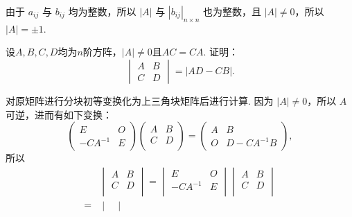 \begin{exercise}
\begin{exgroup}
\begin{answer}
            由于 $a_{ij}$ 与 $b_{ij}$ 均为整数，所以 $|A|$ 与 $|b_{ij}|_{n \times n}$ 也为整数，且 $|A| \neq 0$，所以 $|A| = \pm 1$.
        \end{answer}

        \item 设$A,B,C,D$均为$n$阶方阵，$\lvert A \rvert \neq 0$且$AC=CA$. 证明：
        \[\begin{vmatrix}
                A & B \\ C & D
            \end{vmatrix} = |AD-CB|.\]
        \begin{answer}
            对原矩阵进行分块初等变换化为上三角块矩阵后进行计算. 因为 $\lvert A \rvert \neq 0$，所以 $A$ 可逆，进而有如下变换：
            \[\begin{pmatrix}
                    E        & O \\
                    -CA^{-1} & E
                \end{pmatrix} \begin{pmatrix}
                    A & B \\
                    C & D \\
                \end{pmatrix} = \begin{pmatrix}
                    A & B          \\
                    O & D-CA^{-1}B
                \end{pmatrix},\]
            所以
            \begin{align*}
                    & \begin{vmatrix}
                            A & B \\
                            C & D \\
                        \end{vmatrix}
                = \begin{vmatrix}
                        E        & O \\
                        -CA^{-1} & E \\
                    \end{vmatrix}
                \begin{vmatrix}
                    A & B \\
                    C & D \\
                \end{vmatrix}       \\
                ={} & \begin{vmatrix}

\end{vmatrix}
\end{align*}
\end{answer}
\end{exgroup}
\end{exercise}
